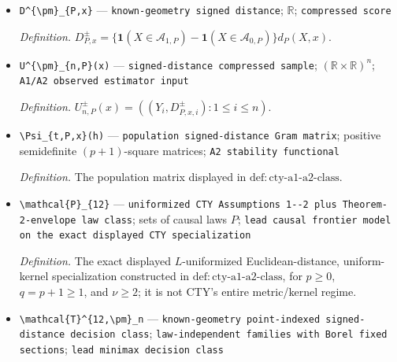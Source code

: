 \documentclass{article}
\begin{document}
\begin{itemize}
  \par\smallskip\noindent\emph{Definition.} \(r_p(u)=(1,u,\ldots,u^p)^\top\).
  \item \texttt{D\textasciicircum{}\{\textbackslash{}\allowbreak{}pm\}\allowbreak{}\_\allowbreak{}\{P,\allowbreak{}x\}\allowbreak{}} --- \texttt{known-\allowbreak{}geometry signed distance}; \(\mathbb R\); \texttt{compressed score}
  \par\smallskip\noindent\emph{Definition.} \(D^{\pm}_{P,x}=\{\mathbf1(X\in\mathcal A_{1,P})-\mathbf1(X\in\mathcal A_{0,P})\}d_P(X,x)\).
  \item \texttt{U\textasciicircum{}\{\textbackslash{}\allowbreak{}pm\}\allowbreak{}\_\allowbreak{}\{n,\allowbreak{}P\}\allowbreak{}(x)} --- \texttt{signed-\allowbreak{}distance compressed sample}; \((\mathbb R\times\mathbb R)^n\); \texttt{A1/\allowbreak{}A2 observed estimator input}
  \par\smallskip\noindent\emph{Definition.} \(U^{\pm}_{n,P}(x)=((Y_i,D^{\pm}_{P,x,i}):1\leq i\leq n)\).
  \item \texttt{\textbackslash{}\allowbreak{}Psi\_\allowbreak{}\{t,\allowbreak{}P,\allowbreak{}x\}\allowbreak{}(h)} --- \texttt{population signed-\allowbreak{}distance Gram matrix}; positive semidefinite \((p+1)\)-square matrices; \texttt{A2 stability functional}
  \par\smallskip\noindent\emph{Definition.} The population matrix displayed in \(\mathrm{def:cty\text{-}a1\text{-}a2\text{-}class}\).
  \item \texttt{\textbackslash{}\allowbreak{}mathcal\{P\}\allowbreak{}\_\allowbreak{}\{12\}\allowbreak{}} --- \texttt{uniformized CTY Assumptions 1-\allowbreak{}-\allowbreak{}2 plus Theorem-\allowbreak{}2-\allowbreak{}envelope law class}; sets of causal laws \(P\); \texttt{lead causal frontier model on the exact displayed CTY specialization}
  \par\smallskip\noindent\emph{Definition.} The exact displayed \(L\)-uniformized Euclidean-distance, uniform-kernel specialization constructed in \(\mathrm{def:cty\text{-}a1\text{-}a2\text{-}class}\), for \(p\geq0\), \(q=p+1\geq1\), and \(\nu\geq2\); it is not CTY's entire metric/kernel regime.
  \item \texttt{\textbackslash{}\allowbreak{}mathcal\{T\}\allowbreak{}\textasciicircum{}\{12,\allowbreak{}\textbackslash{}\allowbreak{}pm\}\allowbreak{}\_\allowbreak{}n} --- \texttt{known-\allowbreak{}geometry point-\allowbreak{}indexed signed-\allowbreak{}distance decision class}; \texttt{law-\allowbreak{}independent families with Borel fixed sections}; \texttt{lead minimax decision class}

\end{itemize}
\end{document}
